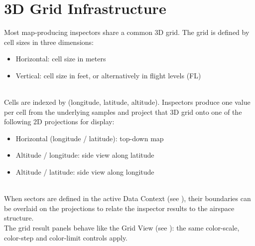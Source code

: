 \section{3D Grid Infrastructure}
\label{sec:analyze_grid}

Most map-producing inspectors share a common 3D grid. The grid is defined by cell sizes in three dimensions:

\begin{itemize}
\item Horizontal: cell size in meters
\item Vertical: cell size in feet, or alternatively in flight levels (FL)
\end{itemize}
\ \\

Cells are indexed by (longitude, latitude, altitude). Inspectors produce one value per cell from the underlying samples and project that 3D grid onto one of the following 2D projections for display:

\begin{itemize}
\item Horizontal (longitude / latitude): top-down map
\item Altitude / longitude: side view along latitude
\item Altitude / latitude: side view along longitude
\end{itemize}
\ \\

When sectors are defined in the active Data Context (see ), their boundaries can be overlaid on the projections to relate the inspector results to the airspace structure. \\

The grid result panels behave like the Grid View (see ): the same color-scale, color-step and color-limit controls apply. \\

